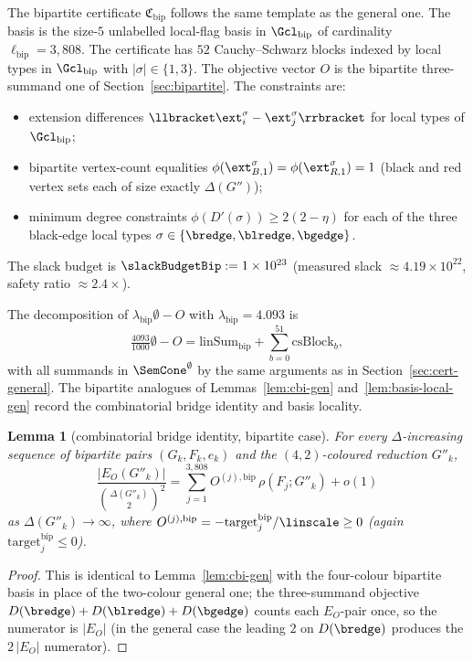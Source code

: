 \documentclass[11pt,a4paper]{article}
\newtheorem{lemma}[theorem]{Lemma}
\theoremstyle{definition}
\theoremstyle{remark}
\begin{document}
The bipartite certificate $\mathfrak{C}_{\mathrm{bip}}$ follows the
same template as the general one. The basis is the size-$5$
unlabelled local-flag basis in $\Gcl_{\mathrm{bip}}$ of cardinality
$\ell_{\mathrm{bip}} = 3{,}808$. The certificate has $52$
Cauchy--Schwarz blocks indexed by local types in $\Gcl_{\mathrm{bip}}$
with $|\sigma| \in \{1, 3\}$. The objective vector $O$ is the bipartite
three-summand one of Section~\ref{sec:bipartite}. The constraints
are:
\begin{itemize}
\item extension differences
$\llbracket \ext_i^\sigma - \ext_j^\sigma\rrbracket$ for local
types of $\Gcl_{\mathrm{bip}}$;
\item bipartite vertex-count equalities
$\phi(\ext_{B,1}^\sigma) = \phi(\ext_{R,1}^\sigma) = 1$
(black and red vertex sets each of size exactly $\Delta(G'')$);
\item minimum degree constraints
$\phi(D'(\sigma)) \geq 2(2-\eta)$ for each of the three
black-edge local types $\sigma \in \{\bredge, \blredge, \bgedge\}$.
\end{itemize}
The slack budget is $\slackBudgetBip := 1 \times 10^{23}$
(measured slack $\approx 4.19 \times 10^{22}$, safety ratio
$\approx 2.4\times$).

The decomposition of $\lambda_{\mathrm{bip}}\emptyset - O$ with
$\lambda_{\mathrm{bip}} = 4.093$ is
\[
\tfrac{4093}{1000}\emptyset - O
= \mathrm{linSum}_{\mathrm{bip}}
+ \sum_{b = 0}^{51} \mathrm{csBlock}_b,
\]
with all summands in $\SemCone^\emptyset$ by the same arguments as
in Section~\ref{sec:cert-general}. The bipartite analogues of Lemmas~\ref{lem:cbi-gen}
and~\ref{lem:basis-local-gen} record the combinatorial bridge
identity and basis locality.

\begin{lemma}[combinatorial bridge identity, bipartite case]
\label{lem:cbi-bip}
For every $\Delta$-increasing sequence of bipartite pairs
$(G_k, F_k, e_k)$ and the $(4,2)$-coloured reduction $G''_k$,
\[
\frac{|E_O(G''_k)|}{\binom{\Delta(G''_k)}{2}^2}
= \sum_{j = 1}^{3{,}808} O^{(j),\mathrm{bip}}\,\rho(F_j; G''_k)
+ o(1)
\]
as $\Delta(G''_k) \to \infty$, where
$O^{(j),\mathrm{bip}} = -\mathrm{target}^{\mathrm{bip}}_j / \linscale \geq 0$
(again $\mathrm{target}^{\mathrm{bip}}_j \leq 0$).
\end{lemma}

\begin{proof}
This is identical to Lemma~\ref{lem:cbi-gen} with the four-colour bipartite
basis in place of the two-colour general one; the three-summand
objective $D(\bredge) + D(\blredge) + D(\bgedge)$ counts each
$E_O$-pair once, so the numerator is $|E_O|$ (in the general case the
leading $2$ on $D(\bredge)$ produces the $2\,|E_O|$ numerator).
\end{proof}
\end{document}
